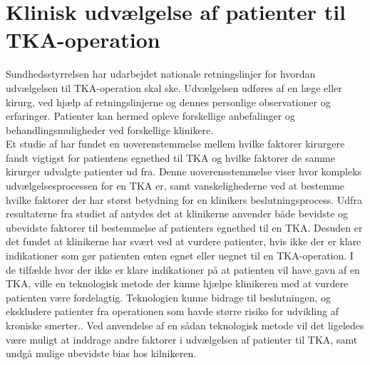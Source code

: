 \section{Klinisk udvælgelse af patienter til TKA-operation}
Sundhedsstyrrelsen har udarbejdet nationale retningslinjer for hvordan udvælgelsen til TKA-operation skal ske. Udvælgelsen udføres af en læge eller kirurg, ved hjælp af retningslinjerne og dennes personlige observationer og erfaringer. Patienter kan hermed opleve forskellige anbefalinger og behandlingsmuligheder ved forskellige klinikere. \\
Et studie af  har fundet en uoverenstemmelse mellem hvilke faktorer kirurgere fandt vigtigst for patientens egnethed til TKA og hvilke faktorer de samme kirurger udvalgte patienter ud fra. Denne uoverensstemmelse viser hvor kompleks udvælgelsesprocessen for en TKA er, samt vanskelighederne ved at bestemme hvilke faktorer der har størst betydning for en klinikers beslutningsprocess. Udfra resultaterne fra studiet af  antydes det at klinikerne anvender både bevidste og ubevidste faktorer til bestemmelse af patienters egnethed til en TKA. Desuden er det fundet at klinikerne har svært ved at vurdere patienter, hvis ikke der er klare indikationer som gør patienten enten egnet eller uegnet til en TKA-operation. 
I de tilfælde hvor der ikke er klare indikationer på at patienten vil have gavn af en TKA, ville en teknologisk metode der kunne hjælpe klinikeren med at vurdere patienten være fordelagtig. Teknologien kunne bidrage til beslutningen, og ekskludere patienter fra operationen som havde større risiko for udvikling af kroniske smerter.. Ved anvendelse af en sådan teknologisk metode vil det ligeledes være muligt at inddrage andre faktorer i udvælgelsen af patienter til TKA, samt undgå mulige ubevidste bias hos kilnikeren. 

